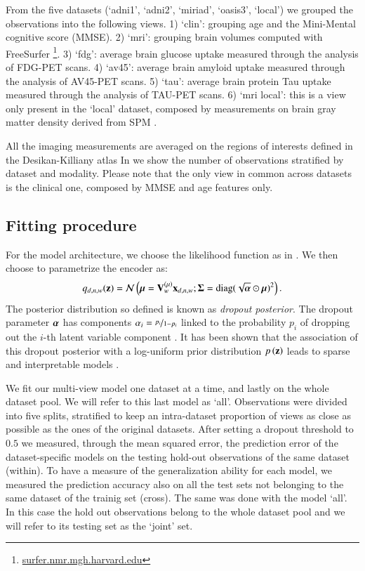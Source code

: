 From the five datasets (`adni1', `adni2', `miriad', `oasis3', `local') we grouped the observations into the following views.
1) `clin': grouping age and the Mini-Mental cognitive score (MMSE).
2) `mri': grouping brain volumes computed with FreeSurfer \footnote{
\href{https://surfer.nmr.mgh.harvard.edu/}{surfer.nmr.mgh.harvard.edu}
}.
3) `fdg': average brain glucose uptake measured through the analysis of FDG-PET scans.
4) `av45': average brain amyloid uptake measured through the analysis of AV45-PET scans.
5) `tau': average brain protein Tau uptake measured through the analysis of TAU-PET scans.
6) `mri local': this is a view only present in the `local' dataset, composed by measurements on brain gray matter density derived from SPM \cite{Ashburner2000}.

All the imaging measurements are averaged on the regions of interests defined in the Desikan-Killiany atlas \cite{Desikan2006}
In  we show the number of observations stratified by dataset and modality.
Please note that the only view in common across datasets is the clinical one, composed by MMSE and age features only.

\subsection{Fitting procedure}
For the model architecture, we choose the likelihood function as in .
We then choose to parametrize the encoder as:
\begin{equation}
\label{eq:dropout_posterior}
    q_{d,n,w}(\mathbf{z}) = \mathcal{N}\left(\boldsymbol{\mu} = \mathbf{V}_w^{(\mu)} \mathbf{x}_{d,n,w};\boldsymbol{\Sigma} = \text{diag}(\sqrt{\boldsymbol{\alpha}} \odot \boldsymbol{\mu})^2\right).
\end{equation}
The posterior distribution so defined is known as \textit{dropout posterior}.
The dropout parameter $\boldsymbol{\alpha}$ has components $\alpha_i = \nicefrac{p_i}{1-p_i}$ linked to the probability $p_i$ of dropping out the $i$-th latent variable component \cite{Wang2013}.
It has been shown that the association of this dropout posterior with a log-uniform prior distribution $p\left(\mathbf{z}\right)$ leads to sparse and interpretable models \cite{Antelmi2019,Molchanov2017}.

We fit our multi-view model one dataset at a time, and lastly on the whole dataset pool.
We will refer to this last model as `all'.
Observations were divided into five splits, stratified to keep an intra-dataset proportion of views as close as possible as the ones of the original datasets.
After setting a dropout threshold to $0.5$ we measured, through the mean squared error, the prediction error of the dataset-specific models on the testing hold-out observations of the same dataset (within).
To have a measure of the generalization ability for each model, we measured the prediction accuracy also on all the test sets not belonging to the same dataset of the trainig set (cross).
The same was done with the model `all'.
In this case the hold out observations belong to the whole dataset pool and we will refer to its testing set as the `joint' set.

